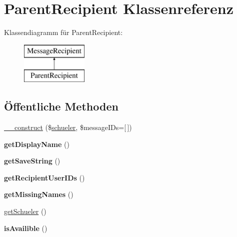 \hypertarget{class_parent_recipient}{}\section{Parent\+Recipient Klassenreferenz}
\label{class_parent_recipient}
Klassendiagramm für Parent\+Recipient\+:\begin{figure}[H]
\begin{center}
\leavevmode
\includegraphics[height=2.000000cm]{class_parent_recipient}
\end{center}
\end{figure}
\subsection*{Öffentliche Methoden}
\begin{DoxyCompactItemize}
\item 
\mbox{\hyperlink{class_parent_recipient_a4169f572dad9ae937e9d4a2bfed16783}{\+\_\+\+\_\+construct}} (\$\mbox{\hyperlink{classschueler}{schueler}}, \$message\+I\+Ds=\mbox{[}$\,$\mbox{]})
\item 
\mbox{\label{class_parent_recipient_aeae8fcc5ddb6528e3892d8e7d8e5f3e2}} 
{\bfseries get\+Display\+Name} ()
\item 
\mbox{\label{class_parent_recipient_a95723558c62ddc4327165d63ba0ca807}} 
{\bfseries get\+Save\+String} ()
\item 
\mbox{\label{class_parent_recipient_a0cc6ac2ec20724b95145941e0733235d}} 
{\bfseries get\+Recipient\+User\+I\+Ds} ()
\item 
\mbox{\label{class_parent_recipient_a01b374717c10f5a08223305569f6dda5}} 
{\bfseries get\+Missing\+Names} ()
\item 
\mbox{\hyperlink{class_parent_recipient_a1ed2846e95f8b119cfe8c75862e71c9a}{get\+Schueler}} ()
\item 
\mbox{\label{class_parent_recipient_a18d0fcf66202031715ba070575b21793}} 
{\bfseries is\+Availible} ()
\end{DoxyCompactItemize}
